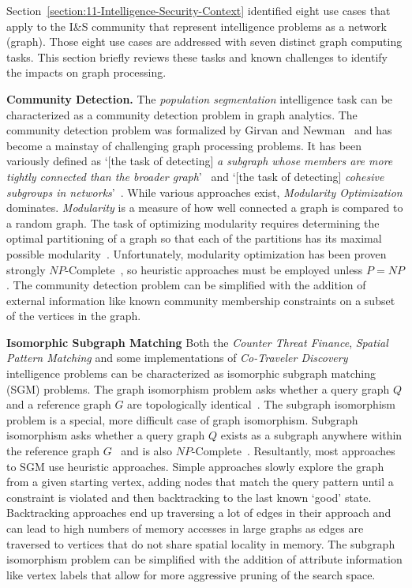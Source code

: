 Section~\ref{section:11-Intelligence-Security-Context} identified eight use cases that apply to the I\&S community that represent intelligence problems as a network (graph). 
Those eight use cases are addressed with seven distinct graph computing tasks. 
This section briefly reviews these tasks and known challenges to identify the impacts on graph processing.

\textbf{Community Detection.}
The \textit{population segmentation} intelligence task can be characterized as a community detection problem in graph analytics. 
The community detection problem was formalized by Girvan and Newman~\cite{Girvan2002} and has become a mainstay of challenging graph processing problems. 
It has been variously defined as `[the task of detecting] \textit{a subgraph whose members are more tightly connected than the broader graph}'~\cite{Fortunato2007} and `[the task of detecting] \textit{cohesive subgroups in networks}'~\cite{Reichardt2006}.
While various approaches exist, \textit{Modularity Optimization} dominates. 
\textit{Modularity} is a measure of how well connected a graph is compared to a random graph. 
The task of optimizing modularity requires determining the optimal partitioning of a graph so that each of the partitions has its maximal possible modularity~\cite{Newman2004a}.
Unfortunately, modularity optimization has been proven strongly $NP$-Complete~\cite{Brandes2006}, so heuristic approaches must be employed unless $P=NP$.
The community detection problem can be simplified with the addition of external information like known community membership constraints on a subset of the vertices in the graph.

\textbf{Isomorphic Subgraph Matching}
Both the \textit{Counter Threat Finance}, \textit{Spatial Pattern Matching} and some implementations of \textit{Co-Traveler Discovery} intelligence problems can be characterized as isomorphic subgraph matching (SGM) problems. 
The graph isomorphism problem asks whether a query graph $Q$ and a reference graph $G$ are topologically identical~\cite{Corneil1970}.
The subgraph isomorphism problem is a special, more difficult case of graph isomorphism. 
Subgraph isomorphism asks whether a query graph $Q$ exists as a subgraph anywhere within the reference graph $G$~\cite{Cook1971} and is also $NP$-Complete~\cite{Bachl1999}.
Resultantly, most approaches to SGM use heuristic approaches. 
Simple approaches slowly explore the graph from a given starting vertex, adding nodes that match the query pattern until a constraint is violated and then backtracking to the last known `good' state. 
Backtracking approaches end up traversing a lot of edges in their approach and can lead to high numbers of memory accesses in large graphs as edges are traversed to vertices that do not share spatial locality in memory.
The subgraph isomorphism problem can be simplified with the addition of attribute information like vertex labels that allow for more aggressive pruning of the search space. 

